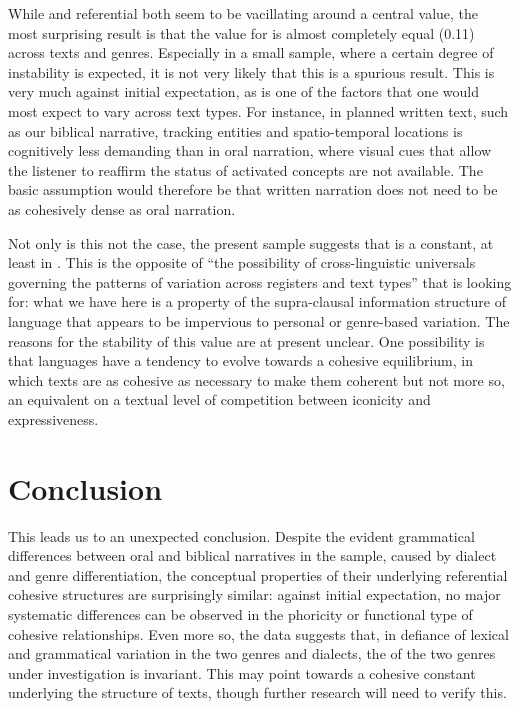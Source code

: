 \documentclass[output=paper
,modfonts
,nonflat]{langsci/langscibook}
\begin{document}
While  and referential  both seem to be vacillating around a central value, the most surprising result is that the value for  is almost completely equal (0.11) across texts and genres. Especially in a small sample, where a certain degree of instability is expected, it is not very likely that this is a spurious result. This is very much against initial expectation, as  is one of the factors that one would most expect to vary across text types. For instance, in planned written text, such as our biblical narrative, tracking entities and spatio-temporal locations is cognitively less demanding than in oral narration, where visual cues that allow the listener to reaffirm the status of activated concepts are not available. The basic assumption would therefore be that written narration does not need to be as cohesively dense as oral narration.

Not only is this not the case, the present sample suggests that  is a constant, at least in . This is the opposite of “the possibility of cross-linguistic universals governing the patterns of  variation across registers and text types” that \citet[359]{Biber1995} is looking for: what we have here is a property of the supra-clausal information structure of language that appears to be impervious to personal or genre-based variation. The reasons for the stability of this value are at present unclear. One possibility is that languages have a tendency to evolve towards a cohesive equilibrium, in which texts are as cohesive as necessary to make them coherent but not more so, an equivalent on a textual level of  competition between iconicity and expressiveness.

\section{\label{s4}Conclusion}

This leads us to an unexpected conclusion. Despite the evident grammatical differences between oral and biblical narratives in the sample, caused by dialect and genre differentiation, the conceptual properties of their underlying referential cohesive structures are surprisingly similar: against initial expectation, no major systematic differences can be observed in the phoricity or functional type of cohesive relationships. Even more so, the data suggests that, in defiance of lexical and grammatical variation in the two genres and dialects, the  of the two genres under investigation is invariant. This may point towards a cohesive constant underlying the structure of  texts, though further research will need to verify this.
\end{document}
